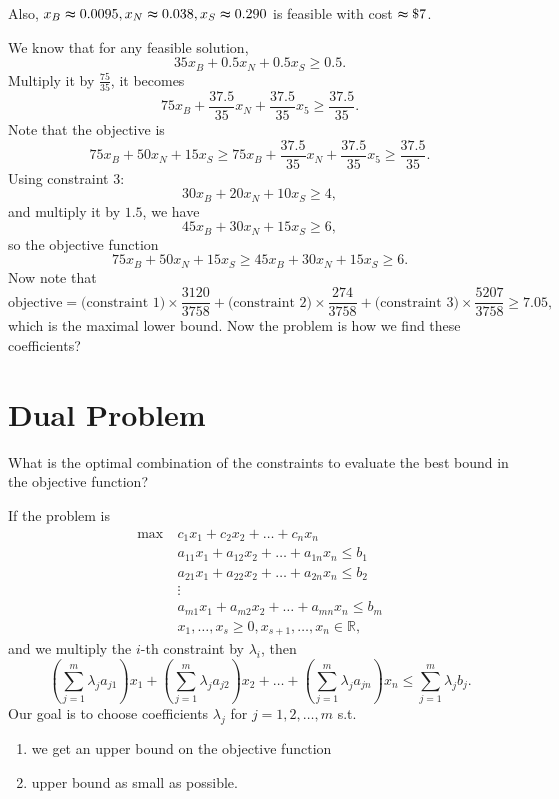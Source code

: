 \begin{eg}
Also, \(x_B \thickapprox 0.0095, x_N \thickapprox 0.038, x_S \thickapprox 0.290\) is feasible with cost \(\thickapprox \$ 7\).

We know that for any feasible solution, 
\[
    35 x_B + 0.5 x_N + 0.5 x_S \ge 0.5.
\]
Multiply it by \(\frac{75}{35}\), it becomes 
\[
    75 x_B + \frac{37.5}{35} x_N + \frac{37.5}{35} x_5 \ge \frac{37.5}{35}.
\] 
Note that the objective is 
\[
    75 x_B + 50 x_N + 15 x_S \ge 75 x_B + \frac{37.5}{35} x_N + \frac{37.5}{35} x_5 \ge \frac{37.5}{35}. 
\]
Using constraint 3:
\[
    30 x_B + 20 x_N + 10 x_S \ge 4,
\]
and multiply it by \(1.5\), we have 
\[
    45 x_B + 30 x_N + 15 x_S \ge 6,
\]
so the objective function 
\[
    75 x_B + 50 x_N + 15 x_S \ge 45 x_B + 30 x_N + 15 x_S \ge 6. 
\] 
Now note that
\[
     \text{objective} = \text{(constraint 1)} \times \frac{3120}{3758} + \text{(constraint 2)} \times \frac{274}{3758} + \text{(constraint 3)} \times \frac{5207}{3758} \ge 7.05,  
\]
which is the maximal lower bound. Now the problem is how we find these coefficients?
\end{eg}

\section{Dual Problem}
\begin{question}
    What is the optimal combination of the constraints to evaluate the best bound in the objective function?
\end{question}

If the problem is 
\[
    \begin{aligned}
        \max~ & c_1 x_1 + c_2 x_2 + \dots + c_n x_n  \\
            & a_{11} x_1 + a_{12} x_2 + \dots + a_{1n} x_n \le b_1  \\
            & a_{21} x_1 + a_{22} x_2 + \dots + a_{2n} x_n \le b_2 \\
            &\vdots \\
            & a_{m1} x_1 + a_{m2} x_2 + \dots + a_{mn} x_n \le b_m \\
            & x_1, \dots , x_s \ge 0, x_{s+1}, \dots , x_n \in \mathbb{R},
    \end{aligned}
\]
and we multiply the \(i\)-th constraint by \(\lambda _i\), then 
\[
    \left( \sum_{j=1}^m \lambda _j a_{j1}  \right) x_1 + \left( \sum_{j=1}^m \lambda _j a_{j2}  \right) x_2 + \dots + \left( \sum_{j=1}^m \lambda _j a_{jn}  \right) x_n \le \sum_{j=1}^m \lambda _j b_j.    
\]  
Our goal is to choose coefficients \(\lambda _j\) for \(j = 1, 2, \dots , m\) s.t. 
\begin{enumerate}
    \item we get an upper bound on the objective function 
    \item upper bound as small as possible.
\end{enumerate}  

